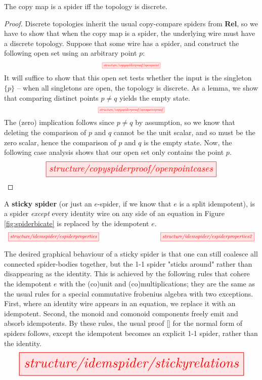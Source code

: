 \begin{myboxR}
\begin{proposition}\label{prop:copydiscrete}
The copy map is a spider iff the topology is discrete.
\begin{proof}
Discrete topologies inherit the usual copy-compare spiders from \textbf{Rel}, so we have to show that when the copy map is a spider, the underlying wire must have a discrete topology. Suppose that some wire has a spider, and construct the following open set using an arbitrary point $p$:
\[\scalebox{0.5}{\tikzfig{structure/copyspiderproof/openpoint}}\]
It will suffice to show that this open set tests whether the input is the singleton $\{p\}$ -- when all singletons are open, the topology is discrete. As a lemma, we show that comparing distinct points $p \neq q$ yields the empty state.
\[\scalebox{0.5}{\tikzfig{structure/copyspiderproof/openpointproof}}\]
The (zero) implication follows since $p \neq q$ by assumption, so we know that deleting the comparison of $p$ and $q$ cannot be the unit scalar, and so must be the zero scalar, hence the comparison of $p$ and $q$ is the empty state. Now, the following case analysis shows that our open set only contains the point $p$.
\[\resizebox{0.75\textwidth}{!}{\tikzfig{structure/copyspiderproof/openpointcases}}\]
\end{proof}
\end{proposition}
\end{myboxR}

\begin{myboxB}
\begin{defn}\label{defn:stickyspider}
A \textbf{sticky spider} (or just an $e$-spider, if we know that $e$ is a split idempotent), is a spider \emph{except} every identity wire on any side of an equation in Figure \ref{fig:spiderbicate} is replaced by the idempotent $e$.
\[\scalebox{0.75}{\tikzfig{structure/idemspider/espiderproperties}} \qquad\qquad\qquad\qquad \scalebox{0.75}{\tikzfig{structure/idemspider/espiderproperties2}}\]
\end{defn}

The desired graphical behaviour of a sticky spider is that one can still coalesce all connected spider-bodies together, but the 1-1 spider "sticks around" rather than disappearing as the identity. This is achieved by the following rules that cohere the idempotent $e$ with the (co)unit and (co)multiplications; they are the same as the usual rules for a special commutative frobenius algebra with two exceptions. First, where an identity wire appears in an equation, we replace it with an idempotent. Second, the monoid and comonoid components freely emit and absorb idempotents. By these rules, the usual proof [] for the normal form of spiders follows, except the idempotent becomes an explicit 1-1 spider, rather than the identity.
\[\resizebox{\textwidth}{!}{\tikzfig{structure/idemspider/stickyrelations}}\]
\end{myboxB}

